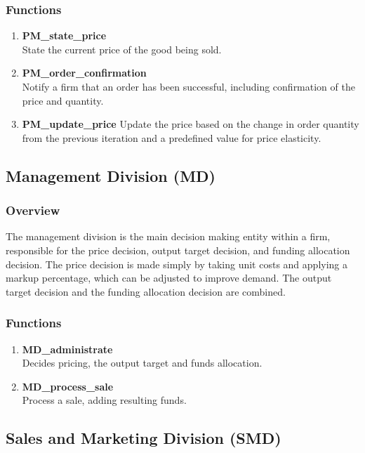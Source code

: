 \documentclass[11pt]{article}
\begin{document}
\subsubsection{Functions}
\begin{enumerate}
	\item \textbf{PM\_state\_price} \\
	State the current price of the good being sold.
	\item \textbf{PM\_order\_confirmation} \\
	Notify a firm that an order has been successful, including confirmation of the price and quantity.
	\item \textbf{PM\_update\_price}
	Update the price based on the change in order quantity from the previous iteration and a predefined value for price elasticity.
\end{enumerate}

\subsection{Management Division (MD)}

\subsubsection{Overview}
The management division is the main decision making entity within a firm, responsible for the price decision, output target decision, and funding allocation decision. The price decision is made simply by taking unit costs and applying a markup percentage, which can be adjusted to improve demand. The output target decision and the funding allocation decision are combined.

\subsubsection{Functions}
\begin{enumerate}
	\item \textbf{MD\_administrate} \\
	Decides pricing, the output target and funds allocation.
	\item \textbf{MD\_process\_sale} \\
	Process a sale, adding resulting funds.
\end{enumerate}

\subsection{Sales and Marketing Division (SMD)}
\end{document}
